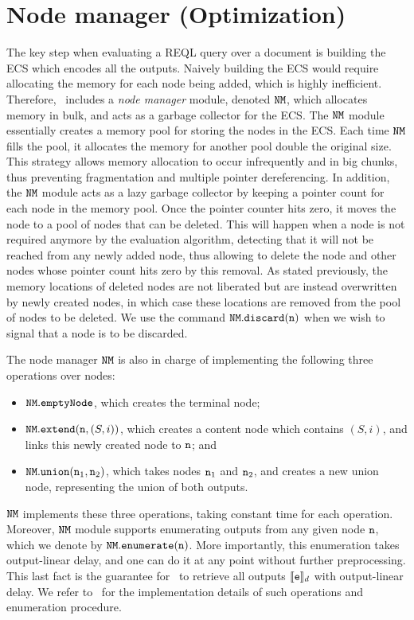 \section{Node manager (Optimization)}

The key step when evaluating a REQL query over a document is building the ECS which encodes all the outputs. Naively building the ECS would require allocating the memory for each node being added, which is highly inefficient. Therefore, \rematch\ includes a \emph{node manager} module, denoted $\mathtt{NM}$, which allocates memory in bulk, and acts as a garbage collector for the ECS. The $\mathtt{NM}$ module essentially creates a memory pool for storing the nodes in the ECS. Each time $\mathtt{NM}$ fills the pool, it allocates the memory for another pool double the original size. This strategy allows memory allocation to occur infrequently and in big chunks, thus preventing fragmentation and multiple pointer dereferencing. In addition, the $\mathtt{NM}$ module acts as a lazy garbage collector by keeping a pointer count for each node in the memory pool. Once the pointer counter hits zero, it moves the node to a pool of nodes that can be deleted. This will happen when a node is not required anymore by the evaluation algorithm, detecting that it will not be reached from any newly added node, thus allowing to delete the node and other nodes whose pointer count hits zero by this removal.
 As stated previously, the memory locations of deleted nodes are not liberated but are instead overwritten by newly created nodes, in which case these locations are removed from the pool of nodes to be deleted. We use the command $\mathtt{NM}.\texttt{discard}(\mathtt{n})$ when we wish to signal that a node is to be discarded.


The node manager $\mathtt{NM}$ is also in charge of implementing the following three operations over nodes:
\begin{itemize}
	\item $\mathtt{NM}.\texttt{emptyNode}$, which creates the terminal node;
	\item $\mathtt{NM}.\texttt{extend}(\mathtt{n},(S,i))$, which creates a content node which contains $(S,i)$, and links this newly created node to $\mathtt{n}$; and
	\item $\mathtt{NM}.\texttt{union}(\mathtt{n}_1,\mathtt{n}_2)$, which takes nodes $\mathtt{n}_1$ and $\mathtt{n}_2$, and creates a new union node, representing the union of both outputs.
\end{itemize}
$\mathtt{NM}$ implements these three operations, taking constant time for each operation. Moreover, $\mathtt{NM}$ module supports enumerating outputs from any given node $\mathtt{n}$, which we denote by $\mathtt{NM}.\texttt{enumerate}(\mathtt{n})$. More importantly, this enumeration takes output-linear delay, and one can do it at any point without further preprocessing. This last fact is the guarantee for \rematch\ to retrieve all outputs $\llbracket\texttt{e}\rrbracket_d$ with output-linear delay. We refer to~\cite{MunozR22} for the implementation details of such operations and enumeration procedure. 



